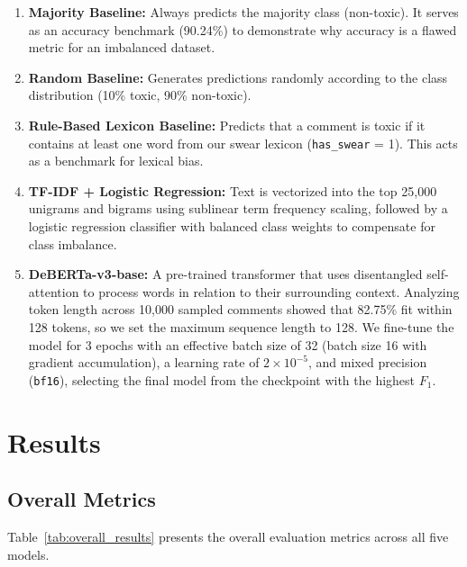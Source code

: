 \documentclass[11pt]{article}
\begin{document}
\begin{enumerate}
  \item \textbf{Majority Baseline:} Always predicts the majority
    class (non-toxic). It serves as an accuracy benchmark (90.24\%)
    to demonstrate why accuracy is a flawed metric for an imbalanced dataset.
  \item \textbf{Random Baseline:} Generates predictions randomly
    according to the class distribution (10\% toxic, 90\% non-toxic).
  \item \textbf{Rule-Based Lexicon Baseline:} Predicts that a comment is
    toxic if it contains at least one word from our swear lexicon
    (\texttt{has\_swear} = 1). This acts as a benchmark for lexical bias.
  \item \textbf{TF-IDF + Logistic Regression:} Text is vectorized
    into the top 25,000 unigrams and bigrams using sublinear term
    frequency scaling, followed by a logistic regression classifier
    with balanced class weights to compensate for class imbalance.
  \item \textbf{DeBERTa-v3-base:} A pre-trained transformer that uses
    disentangled self-attention to process words in relation to their
    surrounding context. Analyzing token length across 10,000 sampled
    comments showed that 82.75\% fit within 128 tokens,
    so we set the maximum sequence length to 128. We fine-tune the model
    for 3 epochs with an effective batch size of 32 (batch size 16 with
    gradient accumulation), a learning rate of $2\times 10^{-5}$, and
    mixed precision (\texttt{bf16}), selecting the final model from the
    checkpoint with the highest $F_1$.
\end{enumerate}

\section{Results}

\subsection{Overall Metrics}

Table~\ref{tab:overall_results} presents the overall evaluation metrics
across all five models.
\end{document}
